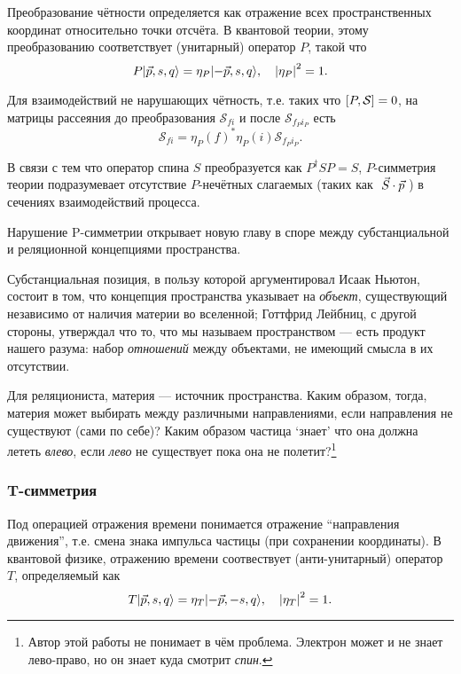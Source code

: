 \documentclass[14pt]{extarticle}
\newcommand{\SMatrix}{\mathcal{S}}
\begin{document}
Преобразование чётности определяется как отражение всех пространственных координат относительно точки отсчёта. В квантовой теории, этому преобразованию соответствует (унитарный) оператор $P$, такой что
\[
P\vert{\vec{p}, s, q}\rangle = \eta_P\vert{-\vec{p}, s, q}\rangle, \quad \left\vert{\eta_P}\right\vert^2 = 1.
\]

Для взаимодействий не нарушающих чётность, т.е. таких что $\sqB{P, \SMatrix} = 0$, на матрицы рассеяния до преобразования $\SMatrix_{fi}$ и после $\SMatrix_{f_P i_P}$ есть
\[
\SMatrix_{fi} = \eta_P(f)^*\eta_P(i)\SMatrix_{f_P i_P}.
\]

В связи с тем что оператор спина $S$ преобразуется как $P^\dagger S P = S$, $P$-симметрия теории подразумевает отсутствие $P$-нечётных слагаемых (таких как $\; {\vec{S}} \cdot {\vec{p}}\;$) в сечениях взаимодействий процесса.~\cite[стр. 30]{Symmetries}\\

\begin{Remark}
Нарушение P-симметрии открывает новую главу в споре между субстанциальной и реляционной концепциями пространства. 

Субстанциальная позиция, в пользу которой аргументировал Исаак Ньютон, состоит в том, что концепция пространства указывает на \emph{объект}, существующий независимо от наличия материи во вселенной; Готтфрид Лейбниц, с другой стороны, утверждал что то, что мы называем пространством --- есть продукт нашего разума: набор \emph{отношений} между объектами, не имеющий смысла в их отсутствии.~\cite[разд. 6.1]{ConceptOfSpace} 

Для реляциониста, материя --- источник пространства. Каким образом, тогда, материя может выбирать между различными направлениями, если направления не существуют (сами по себе)? Каким образом частица `знает' что она должна лететь \emph{влево}, если \emph{лево} не существует пока она не полетит?\footnote{Автор этой работы не понимает в чём проблема. Электрон может и не знает лево-право, но он знает куда смотрит \emph{спин}.}
\end{Remark}

\subsubsection{T-симметрия}

Под операцией отражения времени понимается отражение \enquote{направления движения}, т.е. смена знака импульса частицы (при сохранении координаты). В квантовой физике, отражению времени соотвествует (анти-унитарный) оператор $T$, определяемый как
\[
T\vert{\vec{p}, s, q}\rangle = \eta_T\vert{-\vec{p}, -s, q}\rangle,\quad \left\vert{\eta_T}\right\vert^2 = 1.
\] 
\end{document}

